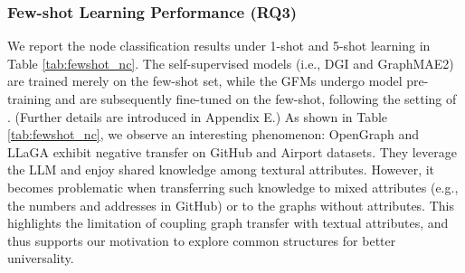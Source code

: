 \subsubsection{\textbf{Few-shot Learning Performance (RQ3)}}

We report the node classification results under 1-shot and 5-shot learning in Table \ref{tab:fewshot_nc}. 
The self-supervised models (i.e., DGI and GraphMAE2) are trained merely on the few-shot set, 
while the GFMs undergo model pre-training and are subsequently fine-tuned on the few-shot, following the setting of \cite{xia2024opengraph}. (Further details are introduced in Appendix E.)
As shown in Table \ref{tab:fewshot_nc}, we observe an interesting phenomenon:
OpenGraph and LLaGA exhibit negative transfer on GitHub and Airport datasets.
They leverage the LLM and enjoy shared knowledge among textural attributes. 
However, it becomes problematic when transferring such knowledge to mixed attributes (e.g., the numbers and addresses in GitHub) or to the graphs  without attributes.
This highlights the limitation of coupling graph transfer with textual attributes, and thus supports our motivation  to explore common structures for better universality.

